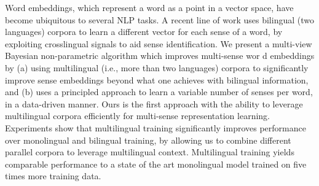 Word embeddings, which represent a word as a point in a vector space, have become ubiquitous to several NLP tasks. A recent line of work uses bilingual (two languages) corpora to learn a different vector for each sense of a word, by exploiting crosslingual signals to aid sense identification. We present a multi-view Bayesian non-parametric algorithm which improves multi-sense wor d embeddings by (a) using multilingual (i.e., more than two languages) corpora to significantly improve sense embeddings beyond what one achieves with bilingual information, and (b) uses a principled approach to learn a variable number of senses per word, in a data-driven manner. Ours is the first approach with the ability to leverage multilingual corpora efficiently for multi-sense representation learning. Experiments show that multilingual training significantly improves performance over monolingual and bilingual training, by allowing us to combine different parallel corpora to leverage multilingual context. Multilingual training yields comparable performance to a state of the art monolingual model trained on five times more training data.
